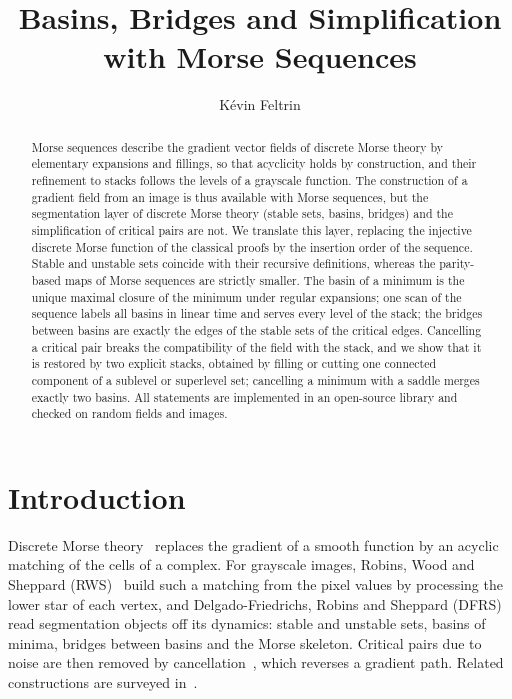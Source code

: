 \documentclass[runningheads]{llncs}
\begin{document}
\title{Basins, Bridges and Simplification with Morse Sequences}
\author{K\'evin Feltrin}

\maketitle

\begin{abstract}
Morse sequences describe the gradient vector fields of discrete Morse theory
by elementary expansions and fillings, so that acyclicity holds by
construction, and their refinement to stacks follows the levels of a
grayscale function. The construction of a gradient field from an image is
thus available with Morse sequences, but the segmentation layer of discrete
Morse theory (stable sets, basins, bridges) and the simplification of
critical pairs are not. We translate this layer, replacing the injective
discrete Morse function of the classical proofs by the insertion order of
the sequence. Stable and unstable sets coincide with their recursive
definitions, whereas the parity-based maps of Morse sequences are strictly
smaller. The basin of a minimum is the unique maximal closure of the
minimum under regular expansions; one scan of the sequence labels all
basins in linear time and serves every level of the stack; the bridges
between basins are exactly the edges of the stable sets of the critical
edges. Cancelling a critical pair
breaks the compatibility of the field with the stack, and we show that it is
restored by two explicit stacks, obtained by filling or cutting one
connected component of a sublevel or superlevel set; cancelling a minimum
with a saddle merges exactly two basins. All statements are implemented in
an open-source library and checked on random fields and images.
\end{abstract}

\section{Introduction}

Discrete Morse theory~\cite{Forman98,Forman02} replaces the gradient of a
smooth function by an acyclic matching of the cells of a complex. For
grayscale images, Robins, Wood and Sheppard (RWS)~\cite{RWS11} build such a
matching from the pixel values by processing the lower star of each vertex,
and Delgado-Friedrichs, Robins and Sheppard (DFRS)~\cite{DFRS15} read
segmentation objects off its dynamics: stable and unstable sets, basins of
minima, bridges between basins and the Morse skeleton. Critical pairs due
to noise are then removed by cancellation~\cite{Forman98}, which
reverses a gradient path. Related constructions are surveyed
in~\cite{DIMS15}.
\end{document}
